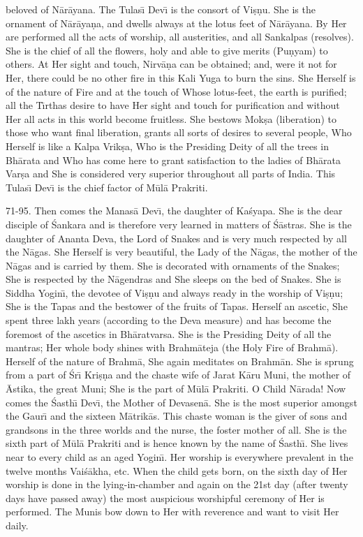 beloved of N\=ar\=ayana. The Tulas\={\i} Dev\={\i} is the consort of Vi\d{s}\d{n}u. She is the ornament of N\=ar\=aya\d{n}a, and dwells always at the lotus feet of N\=ar\=ayana. By Her are performed all the acts of worship, all austerities, and all Sankalpas (resolves). She is the chief of all the flowers, holy and able to give merits (Pu\d{n}yam) to others. At Her sight and touch, Nirv\=a\d{n}a can be obtained; and, were it not for Her, there could be no other fire in this Kali Yuga to burn the sins. She Herself is of the nature of Fire and at the touch of Whose lotus-feet, the earth is purified; all the T\={\i}rthas desire to have Her sight and touch for purification and without Her all acts in this world become fruitless. She bestows Mok\d{s}a (liberation) to those who want final liberation, grants all sorts of desires to several people, Who Herself is like a Kalpa Vrik\d{s}a, Who is the Presiding Deity of all the trees in Bh\=arata and Who has come here to grant satisfaction to the ladies of Bh\=arata Var\d{s}a and She is considered very superior throughout all parts of India. This Tulas\={\i} Dev\={\i} is the chief factor of M\=ul\=a Prakriti.

71-95. Then comes the Manas\=a Dev\={\i}, the daughter of Ka\'syapa. She is the dear disciple of \'Sankara and is therefore very learned in matters of \'S\=astras. She is the daughter of Ananta Deva, the Lord of Snakes and is very much respected by all the N\=agas. She Herself is very beautiful, the Lady of the N\=agas, the mother of the N\=agas and is carried by them. She is decorated with ornaments of the Snakes; She is respected by the N\=agendras and She sleeps on the bed of Snakes. She is Siddha Yogin\={\i}, the devotee of Vi\d{s}\d{n}u and always ready in the worship of Vi\d{s}\d{n}u; She is the Tapas and the bestower of the fruits of Tapas. Herself an ascetic, She spent three lakh years (according to the Deva measure) and has become the foremost of the ascetics in Bh\=aratvarsa. She is the Presiding Deity of all the mantras; Her whole body shines with Brahm\=ateja (the Holy Fire of Brahm\=a). Herself of the nature of Brahm\=a, She again meditates on Brahm\=an. She is sprung from a part of \'Sr\={\i} Kri\d{s}\d{n}a and the chaste wife of Jarat K\=aru Muni, the mother of \=Astika, the great Muni; She is the part of M\=ul\=a Prakriti. O Child N\=arada! Now comes the \'Sasth\={\i} Dev\={\i}, the Mother of Devasen\=a. She is the most superior amongst the Gaur\={\i} and the sixteen M\=atrik\=as. This chaste woman is the giver of sons and grandsons in the three worlds and the nurse, the foster mother of all. She is the sixth part of M\=ul\=a Prakriti and is hence known by the name of \'Sasth\={\i}. She lives near to every child as an aged Yogin\={\i}. Her worship is everywhere prevalent in the twelve months Vai\'s\=akha, etc. When the child gets born, on the sixth day of Her worship is done in the lying-in-chamber and again on the 21st day (after twenty days have passed away) the most auspicious worshipful ceremony of Her is performed. The Munis bow down to Her with reverence and want to visit Her daily.

